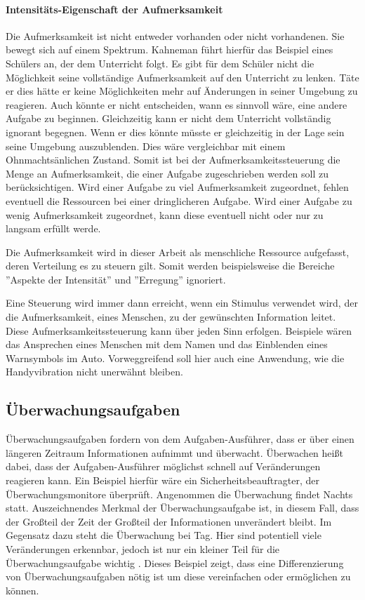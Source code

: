 \documentclass{llncs}					%
\begin{document}
 	\paragraph{Intensitäts-Eigenschaft der Aufmerksamkeit} 	
 	Die Aufmerksamkeit ist nicht entweder vorhanden oder nicht vorhandenen. Sie bewegt sich auf einem Spektrum.
 	Kahneman\cite{kahneman1973attention} führt hierfür das Beispiel eines Schülers an, der dem Unterricht folgt. Es gibt für dem Schüler nicht die Möglichkeit seine vollständige Aufmerksamkeit auf den Unterricht zu lenken. Täte er dies hätte er keine Möglichkeiten mehr auf Änderungen in seiner Umgebung zu reagieren. Auch könnte er nicht entscheiden, wann es sinnvoll wäre, eine andere Aufgabe zu beginnen. Gleichzeitig kann er nicht dem Unterricht vollständig ignorant begegnen. Wenn er dies könnte müsste er gleichzeitig in der Lage sein seine Umgebung auszublenden. Dies wäre vergleichbar mit einem Ohnmachtsänlichen Zustand.
 	Somit ist bei der Aufmerksamkeitssteuerung die Menge an Aufmerksamkeit, die einer Aufgabe zugeschrieben werden soll zu berücksichtigen. Wird einer Aufgabe zu viel Aufmerksamkeit zugeordnet, fehlen eventuell die Ressourcen bei einer dringlicheren Aufgabe. Wird einer Aufgabe zu wenig Aufmerksamkeit zugeordnet, kann diese eventuell nicht oder nur zu langsam erfüllt werde.
 	

Die Aufmerksamkeit wird in dieser Arbeit als menschliche Ressource aufgefasst, deren Verteilung es zu steuern gilt. Somit werden beispielsweise die Bereiche ''Aspekte der Intensität''\cite{kahneman1973attention} und ''Erregung''\cite{kahneman1973attention} ignoriert.

Eine Steuerung wird immer dann erreicht, wenn ein Stimulus verwendet wird, der die Aufmerksamkeit, eines Menschen, zu der gewünschten Information leitet. Diese Aufmerksamkeitssteuerung kann über jeden Sinn erfolgen. Beispiele wären das Ansprechen eines Menschen mit dem Namen und das Einblenden eines Warnsymbols im Auto. Vorweggreifend soll hier auch eine Anwendung, wie die Handyvibration nicht unerwähnt bleiben.

\subsection{Überwachungsaufgaben}
Überwachungsaufgaben fordern von dem Aufgaben-Ausführer, dass er über einen längeren Zeitraum Informationen aufnimmt und überwacht. Überwachen heißt dabei, dass der Aufgaben-Ausführer möglichst schnell auf Veränderungen reagieren kann.
Ein Beispiel hierfür wäre ein Sicherheitsbeauftragter, der Überwachungsmonitore überprüft.
Angenommen die Überwachung findet Nachts statt. Auszeichnendes Merkmal der Überwachungsaufgabe ist, in diesem Fall, dass der Großteil der Zeit der Großteil der Informationen unverändert bleibt.
Im Gegensatz dazu steht die Überwachung bei Tag. Hier sind potentiell viele Veränderungen erkennbar, jedoch ist nur ein kleiner Teil für die Überwachungsaufgabe wichtig \cite{doi:10.1177/001872087902100109}.
Dieses Beispiel zeigt, dass eine Differenzierung von Überwachungsaufgaben nötig ist um diese vereinfachen oder ermöglichen zu können.
\end{document}
